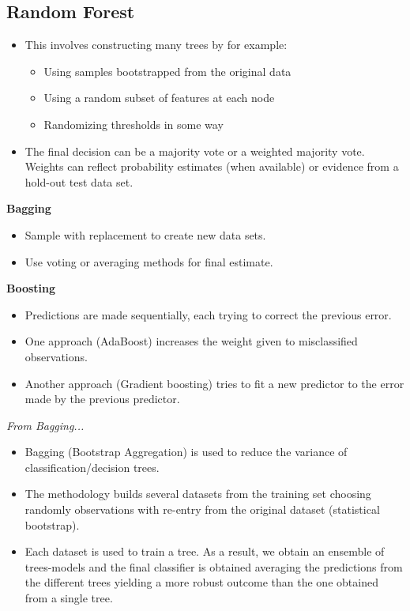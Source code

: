 \subsection{Random Forest}

\begin{itemize}
    \item This involves constructing many trees by for example:
          \begin{itemize}
              \item Using samples bootstrapped from the original data
              \item Using a random subset of features at each node
              \item Randomizing thresholds in some way
          \end{itemize}
    \item The final decision can be a majority vote or a weighted majority vote. Weights can reflect probability estimates (when available) or evidence from a hold-out test data set.
\end{itemize}

\textbf{Bagging}
\begin{itemize}
    \item Sample with replacement to create new data sets.
    \item Use voting or averaging methods for final estimate.
\end{itemize}

\textbf{Boosting}
\begin{itemize}
    \item Predictions are made sequentially, each trying to correct the previous error.
    \item One approach (AdaBoost) increases the weight given to misclassified observations.
    \item Another approach (Gradient boosting) tries to fit a new predictor to the error made by the previous predictor.
\end{itemize}

\textit{From Bagging...}
\begin{itemize}
    \item Bagging (Bootstrap Aggregation) is used to reduce the variance of classification/decision trees.
    \item The methodology builds several datasets from the training set choosing randomly observations with re-entry from the original dataset (statistical bootstrap).
    \item Each dataset is used to train a tree. As a result, we obtain an ensemble of trees-models and the final classifier is obtained averaging the predictions from the different trees yielding a more robust outcome than the one obtained from a single tree.
\end{itemize}

